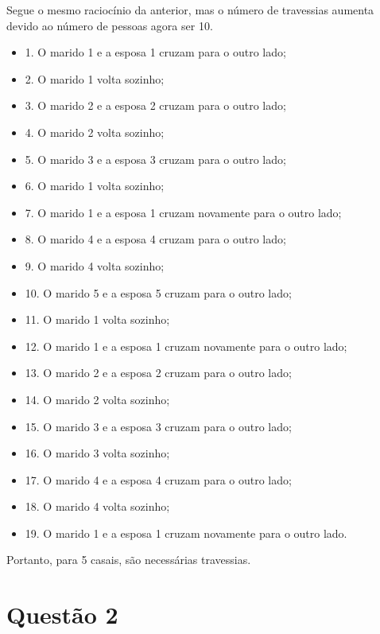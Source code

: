 \vspace{5pt}
Segue o mesmo raciocínio da anterior, mas o número de travessias aumenta devido ao número de pessoas agora ser 10.

\begin{itemize}
    \item 1. O marido 1 e a esposa 1 cruzam para o outro lado;
    \item 2. O marido 1 volta sozinho;
    \item 3. O marido 2 e a esposa 2 cruzam para o outro lado;
    \item 4. O marido 2 volta sozinho;
    \item 5. O marido 3 e a esposa 3 cruzam para o outro lado;
    \item 6. O marido 1 volta sozinho;
    \item 7. O marido 1 e a esposa 1 cruzam novamente para o outro lado;
    \item 8. O marido 4 e a esposa 4 cruzam para o outro lado;
    \item 9. O marido 4 volta sozinho;
    \item 10. O marido 5 e a esposa 5 cruzam para o outro lado;
    \item 11. O marido 1 volta sozinho;
    \item 12. O marido 1 e a esposa 1 cruzam novamente para o outro lado;
    \item 13. O marido 2 e a esposa 2 cruzam para o outro lado;
    \item 14. O marido 2 volta sozinho;
    \item 15. O marido 3 e a esposa 3 cruzam para o outro lado;
    \item 16. O marido 3 volta sozinho;
    \item 17. O marido 4 e a esposa 4 cruzam para o outro lado;
    \item 18. O marido 4 volta sozinho;
    \item 19. O marido 1 e a esposa 1 cruzam novamente para o outro lado.
\end{itemize}

Portanto, para 5 casais, são necessárias  travessias.

\section*{Questão 2}

